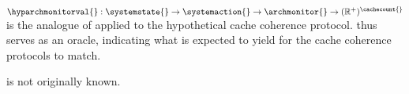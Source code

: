 \begin{definition}
\label{def:identifying:performance_monitor_oracle}
   $\hyparchmonitorval{}: \systemstate{} \to \systemaction{} \to
   \archmonitor{} \to (\mathbb{R}^{+})^\cachecount{}$ is the analogue of
   \archmonitorval{} applied to the hypothetical cache coherence protocol.
   \hyparchmonitorval{} thus serves as an oracle, indicating what
   \archmonitorval{} is expected to yield for the cache coherence protocols to
   match.
\end{definition}

\begin{issue}
   \label{issue:define_event_count}
   \archmonitorval{} is not originally known.
\end{issue}

